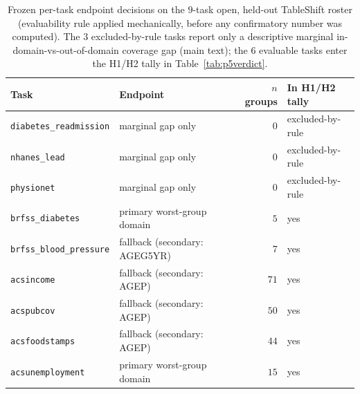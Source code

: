 \documentclass[11pt]{article}
\begin{document}
\begin{table}[h]\centering\small
\caption{Frozen per-task endpoint decisions on the $9$-task open, held-out TableShift roster (evaluability
rule applied mechanically, before any confirmatory number was computed). The $3$ excluded-by-rule tasks
report only a descriptive marginal in-domain-vs-out-of-domain coverage gap (main text); the $6$ evaluable
tasks enter the H1/H2 tally in Table~\ref{tab:p5verdict}.}\label{tab:p5roster}
\begin{tabular}{llrl}
\toprule
Task & Endpoint & $n$ groups & In H1/H2 tally \\
\midrule
\texttt{diabetes\_readmission} & marginal gap only & $0$ & excluded-by-rule \\
\texttt{nhanes\_lead} & marginal gap only & $0$ & excluded-by-rule \\
\texttt{physionet} & marginal gap only & $0$ & excluded-by-rule \\
\texttt{brfss\_diabetes} & primary worst-group domain & $5$ & yes \\
\texttt{brfss\_blood\_pressure} & fallback (secondary: AGEG5YR) & $7$ & yes \\
\texttt{acsincome} & fallback (secondary: AGEP) & $71$ & yes \\
\texttt{acspubcov} & fallback (secondary: AGEP) & $50$ & yes \\
\texttt{acsfoodstamps} & fallback (secondary: AGEP) & $44$ & yes \\
\texttt{acsunemployment} & primary worst-group domain & $15$ & yes \\
\bottomrule
\end{tabular}
\end{table}
\end{document}
